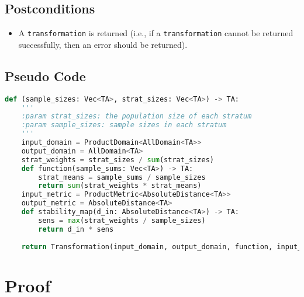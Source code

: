 \documentclass[11pt,a4paper]{article}
\begin{document}
\subsection*{Postconditions}
\begin{itemize}
    \item A \texttt{transformation} is returned (i.e., if a \texttt{transformation} cannot be returned successfully, then an error should be returned).
\end{itemize}

\subsection*{Pseudo Code}
\begin{lstlisting}[language=Python, escapechar=|]
def (sample_sizes: Vec<TA>, strat_sizes: Vec<TA>) -> TA:
    '''
    :param strat_sizes: the population size of each stratum
    :param sample_sizes: sample sizes in each stratum 
    '''
    input_domain = ProductDomain<AllDomain<TA>>
    output_domain = AllDomain<TA>
    strat_weights = strat_sizes / sum(strat_sizes)
    def function(sample_sums: Vec<TA>) -> TA:
        strat_means = sample_sums / sample_sizes
        return sum(strat_weights * strat_means)
    input_metric = ProductMetric<AbsoluteDistance<TA>>
    output_metric = AbsoluteDistance<TA>
    def stability_map(d_in: AbsoluteDistance<TA>) -> TA:
        sens = max(strat_weights / sample_sizes)
        return d_in * sens
        
    return Transformation(input_domain, output_domain, function, input_metric, output_metric, stability_map)         
\end{lstlisting}


\section{Proof}
\end{document}
